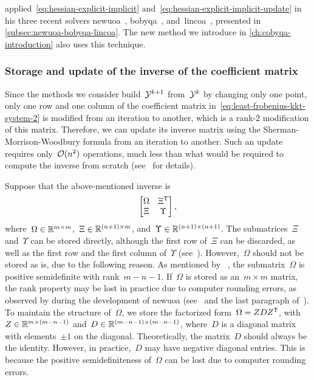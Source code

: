 \citeauthor{Powell_2006} applied~\cref{eq:hessian-explicit-implicit} and~\cref{eq:hessian-explicit-implicit-update} in his three recent solvers \gls{newuoa}~\cite{Powell_2006}, \gls{bobyqa}~\cite{Powell_2009}, and~\gls{lincoa}~\cite{Powell_2015}, presented in \cref{subsec:newuoa-bobyqa-lincoa}.
The new method we introduce in \cref{ch:cobyqa-introduction} also uses this technique.

\subsubsection{Storage and update of the inverse of the coefficient matrix}

Since the methods we consider build~$\xpt[k + 1]$ from~$\xpt[k]$ by changing only one point, only one row and one column of the coefficient matrix in~\cref{eq:least-frobenius-kkt-system-2} is modified from an iteration to another, which is a rank-$2$ modification of this matrix.
Therefore, we can update its inverse matrix using the Sherman-Morrison-Woodbury formula from an iteration to another.
Such an update requires only~$\operatorname{\mathcal{O}}(n^2)$ operations, much less than what would be required to compute the inverse from scratch (see~\cite[\S~2]{Powell_2004c} for details).

Suppose that the above-mentioned inverse is
\begin{equation*}
    \begin{bmatrix}
        \Omega  & \Xi^{\mathsf{T}}\\
        \Xi     & \Upsilon
    \end{bmatrix},
\end{equation*}
where~$\Omega \in \mathbb{R}^{m \times m}$,~$\Xi \in \mathbb{R}^{(n + 1) \times m}$, and~$\Upsilon \in \mathbb{R}^{(n + 1) \times (n + 1)}$.
The submatrices~$\Xi$ and~$\Upsilon$ can be stored directly, although the first row of~$\Xi$ can be discarded, as well as the first row and the first column of~$\Upsilon$ (see~\cite[\S~4]{Powell_2006}).
However,~$\Omega$ should not be stored as is, due to the following reason.
As mentioned by \citeauthor{Powell_2004c}~\cite{Powell_2004c}, the submatrix~$\Omega$ is positive semidefinite with rank~$m - n - 1$.
If~$\Omega$ is stored as an~$m \times m$ matrix, the rank property may be lost in practice due to computer rounding errors, as observed by \citeauthor{Powell_2004c} during the development of \gls{newuoa} (see~\cite[\S~1]{Powell_2004c} and the last paragraph of~\cite[\S~8]{Powell_2006}).
To maintain the structure of~$\Omega$, we store the factorized form~$\Omega = Z D Z^{\mathsf{T}}$, with~$Z \in \mathbb{R}^{m \times (m - n - 1)}$ and~$D \in \mathbb{R}^{(m - n - 1) \times (m - n - 1)}$, where~$D$ is a diagonal matrix with elements~$\pm 1$ on the diagonal.
Theoretically, the matrix~$D$ should always be the identity.
However, in practice,~$D$ may have negative diagonal entries.
This is because the positive semidefiniteness of~$\Omega$ can be lost due to computer rounding errors.

